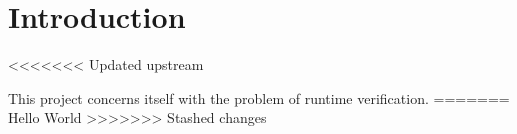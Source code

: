 \section{Introduction}
<<<<<<< Updated upstream

This project concerns itself with the problem of runtime verification.
=======
Hello World
>>>>>>> Stashed changes
